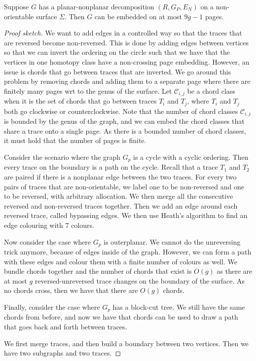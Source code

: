 \begin{lemma}\label{lem:planar_nonplanar_nonorientable}
	Suppose \(G\) has a planar-nonplanar decomposition \((R, G_P, E_N)\) on a non-orientable surface \(\Sigma\). Then \(G\) can be embedded on at most \(9g - 1\) pages.
\end{lemma}
\begin{proof}[Proof sketch]
	We want to add edges in a controlled way so that the traces that are reversed become non-reversed. This is done by adding edges between vertices so that we can invert the ordering on the circle such that we have that the vertices in one homotopy class have a non-crossing page embedding. However, an issue is chords that go between traces that are inverted. We go around this problem by removing chords and adding them to a separate page where there are finitely many pages wrt to the genus of the surface. Let \(\mathcal{C}_{i,j}\) be a chord class when it is the set of chords that go between traces \(T_i\) and \(T_j\), where \(T_i\) and \(T_j\) both go clockwise or counterclockwise. Note that the number of chord classes \(\mathcal{C}_{i,j}\) is bounded by the genus of the graph, and we can embed the chord classes that share a trace onto a single page. As there is a bounded number of chord classes, it must hold that the number of pages is finite.

	Consider the scenario where the graph $G_p$ is a cycle with a cyclic ordering. Then every trace on the boundary is a path on the cycle. Recall that a trace $T_1$ and $T_2$ are paired if there is a nonplanar edge between the two traces. For every two pairs of traces that are non-orientable, we label one to be non-reversed and one to be reversed, with arbitrary allocation. We then merge all the consecutive reversed and non-reversed traces together. Then we add an edge around each reversed trace, called bypassing edges. We then use Heath's algorithm to find an edge colouring with 7 colours.

	Now consider the case where $G_p$ is outerplanar. We cannot do the unreversing trick anymore, because of edges inside of the graph. However, we can form a path with these edges and colour them with a finite number of colours as well.
	We bundle chords together and the number of chords that exist is $O(g)$ as there are at most $g$ reversed-unreversed trace changes on the boundary of the surface. As no chords cross, then we have that there are $O(g)$ chords. 

	Finally, consider the case where $G_p$ has a block-cut tree. We still have the same chords from before, and now we have that chords can be used to draw a path that goes back and forth between traces.

	We first merge traces, and then build a boundary between two vertices. Then we have two subgraphs and two traces. 
\end{proof}
